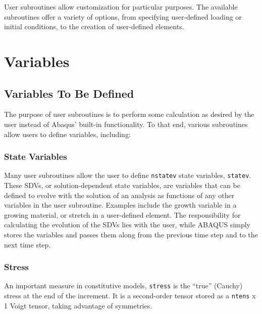 \documentclass[10pt,letterpaper,oneside]{report}
\begin{document}
User subroutines allow customization for particular purposes.  The available subroutines offer a variety of options, from specifying user-defined loading or initial conditions, to the creation of user-defined elements.  


\section{Variables}

\subsection{Variables To Be Defined}
The purpose of user subroutines is to perform some calculation as desired by the user instead of Abaqus' built-in functionality.  To that end, various subroutines allow users to define variables, including: 

\subsubsection{State Variables}
Many user subroutines allow the user to define \texttt{nstatev} state variables, \texttt{statev}.  These SDVs, or solution-dependent state variables, are variables that can be defined to evolve with the solution of an analysis as functions of any other variables in the user subroutine.  Examples include the growth variable in a growing material, or stretch in a user-defined element.  The responsibility for calculating the evolution of the SDVs lies with the user, while ABAQUS simply stores the variables and passes them along from the previous time step and to the next time step.  

\subsubsection{Stress}
An important measure in constitutive models, \texttt{stress} is the “true” (Cauchy) stress at the end of the increment.  It is a second-order tensor stored as a \texttt{ntens} x 1 Voigt tensor, taking advantage of symmetries.
\end{document}
